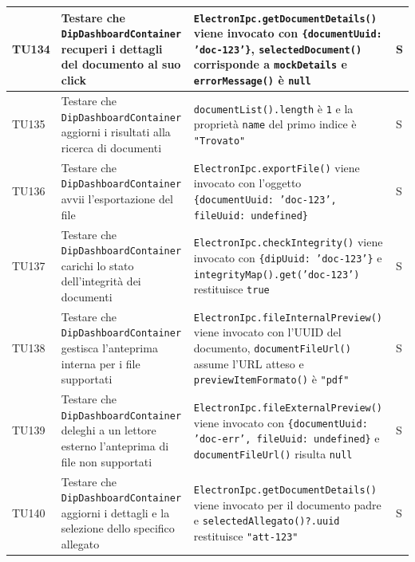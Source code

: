 \documentclass[a4paper,12pt]{article}
\begin{document}
\begin{longtable}{|M{1.2cm}|M{5cm}|M{7cm}|M{1.5cm}|}
            TU134 & Testare che \texttt{DipDashboardContainer} recuperi i dettagli del documento al suo click & \texttt{ElectronIpc.getDocumentDetails()} viene invocato con \texttt{\{documentUuid: 'doc-123'\}}, \texttt{selectedDocument()} corrisponde a \texttt{mockDetails} e \texttt{errorMessage()} è \texttt{null} & S \\ 
            \hline
            
            TU135 & Testare che \texttt{DipDashboardContainer} aggiorni i risultati alla ricerca di documenti & \texttt{documentList().length} è \texttt{1} e la proprietà \texttt{name} del primo indice è \texttt{"Trovato"} & S \\ 
            \hline
            
            TU136 & Testare che \texttt{DipDashboardContainer} avvii l'esportazione del file & \texttt{ElectronIpc.exportFile()} viene invocato con l'oggetto \texttt{\{documentUuid: 'doc-123', fileUuid: undefined\}} & S \\ 
            \hline
            
            TU137 & Testare che \texttt{DipDashboardContainer} carichi lo stato dell'integrità dei documenti & \texttt{ElectronIpc.checkIntegrity()} viene invocato con \texttt{\{dipUuid: 'doc-123'\}} e \texttt{integrityMap().get('doc-123')} restituisce \texttt{true} & S \\ 
            \hline
            
            TU138 & Testare che \texttt{DipDashboardContainer} gestisca l'anteprima interna per i file supportati & \texttt{ElectronIpc.fileInternalPreview()} viene invocato con l'UUID del documento, \texttt{documentFileUrl()} assume l'URL atteso e \texttt{previewItemFormato()} è \texttt{"pdf"} & S \\ 
            \hline
            
            TU139 & Testare che \texttt{DipDashboardContainer} deleghi a un lettore esterno l'anteprima di file non supportati & \texttt{ElectronIpc.fileExternalPreview()} viene invocato con \texttt{\{documentUuid: 'doc-err', fileUuid: undefined\}} e \texttt{documentFileUrl()} risulta \texttt{null} & S \\ 
            \hline
            
            TU140 & Testare che \texttt{DipDashboardContainer} aggiorni i dettagli e la selezione dello specifico allegato & \texttt{ElectronIpc.getDocumentDetails()} viene invocato per il documento padre e \texttt{selectedAllegato()?.uuid} restituisce \texttt{"att-123"} & S \\ 
            \hline
            

\end{longtable}
\end{document}
